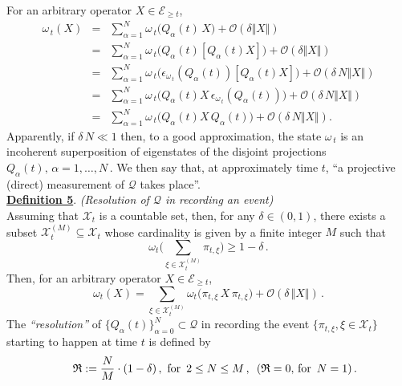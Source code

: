 \documentclass[a4paper,11pt]{article}
\begin{document}
\begin{enumerate}
{For an arbitrary operator $X\in \mathcal{E}_{\geq t}$,
\begin{eqnarray}\label{superpos}
\omega_{\,t}(X)&=& \sum_{\alpha=1}^{N} \omega_{\,t} \big(Q_{\alpha}(t)\,X\big) + \mathcal{O}(\delta \Vert X \Vert) \nonumber\\
&=& \sum_{\alpha=1}^{N} \omega_{\,t}\big(Q_{\alpha}(t)[Q_{\alpha}(t) X]\big) + \mathcal{O}(\delta \Vert X \Vert) \nonumber\\
&=& \sum_{\alpha=1}^{N} \omega_{\,t}\big(\epsilon_{\omega_{\,t}}(Q_{\alpha}(t))[Q_{\alpha}(t) X]\big) + \mathcal{O}(\delta \,N \Vert X \Vert) \nonumber \\
\quad &=& \sum_{\alpha=1}^{N} \omega_{\,t}\big(Q_{\alpha}(t) X\, \epsilon_{\omega_{\,t}}(Q_{\alpha}(t))\big) + \mathcal{O}(\delta \,N \Vert X \Vert) \nonumber\\
&=&  \sum_{\alpha=1}^{N} \omega_{\,t}\big(Q_{\alpha}(t) X\,Q_{\alpha}(t)\big) + \mathcal{O}(\delta \,N \Vert X \Vert).
\end{eqnarray}
Apparently, if $\delta \, N\ll 1$ then, to a good approximation, the state $\omega_{\,t}$ is an incoherent superposition of eigenstates of the disjoint projections $Q_{\alpha}(t), \, \alpha = 1,\dots, N$\,. We then say that, at approximately time $t$, ``a projective (direct) measurement of $\mathcal{Q}$ takes place''.\\

\underline{\bf{Definition 5}}. \textit{(Resolution of $\mathcal{Q}$ in recording an event)}\\
Assuming that $\mathcal{X}_{t}$ is a countable set, then, for any $\delta \in (0,1)$, there exists a subset $\mathcal{X}_{t}^{(M)} \subseteq \mathcal{X}_t$ whose cardinality is given by a finite integer $M$ such that 
$$\omega_{t}\Big( \sum_{\xi \in \mathcal{X}_{t}^{(M)}} \pi_{t, \xi} \Big) \geq 1-\delta\,.$$
Then, for an arbitrary operator $X\in \mathcal{E}_{\geq t}$,
$$\omega_{t}(X)= \sum_{\xi \in \mathcal{X}_{t}^{(M)}} \omega_{t} \big(\pi_{t,\xi}\,X\, \pi_{t,\xi} \big) + \mathcal{O}(\delta\,\Vert X \Vert)\,.$$
The \textit{``resolution''} of $\lbrace Q_{\alpha}(t) \rbrace_{\alpha=0}^{N} \subset \mathcal{Q}$ in recording the event \mbox{$\lbrace \pi_{t,\xi}, \xi \in \mathcal{X}_{t} \rbrace$} starting to happen at time $t$ is defined by
\begin{equation}\label{resolution}
\hspace{1cm} \mathfrak{R}:= \frac{N}{M}\cdot(1-\delta) \,, \,\,\text{for  }\, 2\leq N \leq M\,,\,\,\, (\mathfrak{R}=0, \, \text{for   }\, N=1)\,. \hspace{0.6cm} \square
\end{equation}

}
\end{enumerate}
\end{document}
